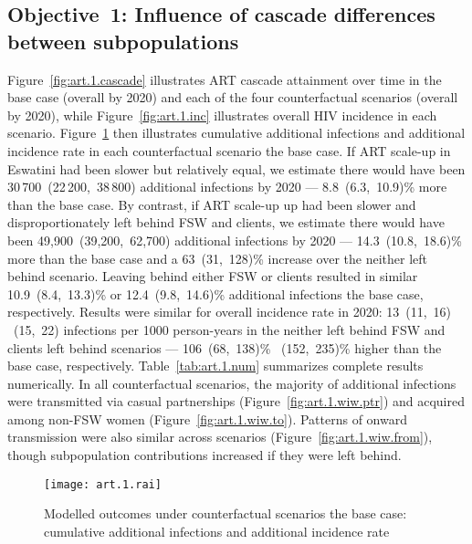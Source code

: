 \subsection{Objective~1: Influence of cascade differences between subpopulations}\label{art.res.1}
Figure~\ref{fig:art.1.cascade} illustrates ART cascade attainment over time
in the base case (\cashi overall by 2020) and
each of the four counterfactual scenarios (\casmd overall by 2020), while
Figure~\ref{fig:art.1.inc} illustrates overall HIV incidence in each scenario.
Figure~\ref{fig:art.1.rai} then illustrates
cumulative additional infections and additional incidence rate
in each counterfactual scenario \vs the base case.
If ART scale-up in Eswatini had been slower but relatively equal,
we estimate there would have been
30\,700~(22\,200,~38\,800) additional infections by 2020 ---
8.8~(6.3,~10.9)\% more than the base case. %
By contrast, if ART scale-up up had been slower and
disproportionately left behind FSW and clients,
we estimate there would have been
49,900~(39,200,~62,700) additional infections by 2020 ---
14.3~(10.8,~18.6)\% more than the base case %
and a 63~(31,~128)\% increase over the neither left behind scenario. %
Leaving behind either FSW or clients resulted in similar
10.9~(8.4,~13.3)\% or 12.4~(9.8,~14.6)\% additional infections
\vs the base case, respectively. %
Results were similar for overall incidence rate in 2020:
13~(11,~16) ~(15,~22) infections per 1000 person-years
in the neither left behind \vs FSW and clients left behind scenarios ---
106~(68,~138)\% ~(152,~235)\% higher than the base case, respectively.
Table~\ref{tab:art.1.num} summarizes complete results numerically.
In all counterfactual scenarios, the majority of additional infections were
transmitted via casual partnerships (Figure~\ref{fig:art.1.wiw.ptr}) %
and acquired among non-FSW women (Figure~\ref{fig:art.1.wiw.to}). %
Patterns of onward transmission were also similar across scenarios %
(Figure~\ref{fig:art.1.wiw.from}),
though subpopulation contributions increased if they were left behind.
\begin{figure}[h]
  \centering\texttt{[image: art.1.rai]}
  \caption{Modelled outcomes under counterfactual scenarios \vs the base case:
    cumulative additional infections and additional incidence rate}
  \label{fig:art.1.rai}
\end{figure}
